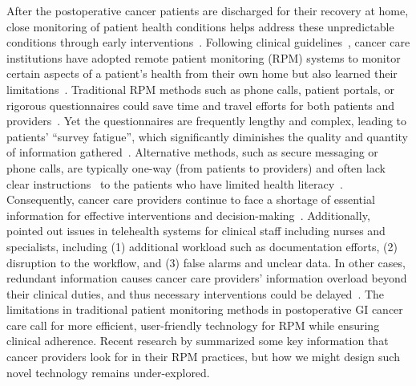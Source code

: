 After the postoperative cancer patients are discharged for their recovery at home, close monitoring of patient health conditions helps address these unpredictable conditions through early interventions~\cite{desrame2024595p}. Following clinical guidelines~\cite{steele1993standard}, cancer care institutions have adopted remote patient monitoring (RPM) systems to monitor certain aspects of a patient's health from their own home but also learned their limitations~\cite{malasingheRemotePatientMonitoring2019}. 
Traditional RPM methods such as phone calls, patient portals, or rigorous questionnaires could save time and travel efforts for both patients and providers~\cite{malasingheRemotePatientMonitoring2019}.
Yet the questionnaires are frequently lengthy and complex, leading to patients' ``survey fatigue'', which significantly diminishes the quality and quantity of information gathered~\cite{li2024beyond, silva_ostomy_2020}. Alternative methods, such as secure messaging or phone calls, are typically one-way (from patients to providers) and often lack clear instructions~\cite{chandwani_stitching_2018} to the patients who have limited health literacy~\cite{cardellaComplianceAttitudesBarriers2008}. Consequently, cancer care providers continue to face a shortage of essential information for effective interventions and decision-making~\cite{yangWishThereWere2024}.
Additionally, \citet{leon2022impact} pointed out issues in telehealth systems for clinical staff including nurses and specialists, including (1) additional workload such as documentation efforts, (2) disruption to the workflow, and (3) false alarms and unclear data.
In other cases, redundant information causes cancer care providers' information overload beyond their clinical duties, and thus necessary interventions could be delayed~\cite{clark_understanding_2021, bhat_infrastructuring_2021, yangWishThereWere2024}.
The limitations in traditional patient monitoring methods in postoperative GI cancer care call for more efficient, user-friendly technology for RPM while ensuring clinical adherence.
Recent research by \citet{yangWishThereWere2024} summarized some key information that cancer providers look for in their RPM practices, but how we might design such novel technology remains under-explored.


